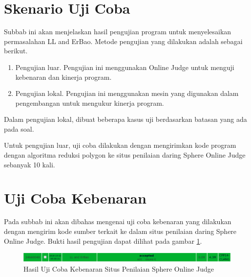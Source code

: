 \section{ Skenario Uji Coba}
\label{sec:skenario-uji-coba}
Subbab ini akan menjelaskan hasil pengujian program untuk menyelesaikan permasalahan LL and ErBao. Metode pengujian yang dilakukan adalah sebagai berikut.
\begin{enumerate}
	\item Pengujian luar. Pengujian ini menggunakan Online Judge untuk menguji kebenaran dan kinerja program.
	\item Pengujian lokal. Pengujian ini menggunakan mesin yang digunakan dalam pengembangan untuk mengukur kinerja program.
\end{enumerate}
Dalam pengujian lokal, dibuat beberapa kasus uji berdasarkan batasan yang ada pada soal.
\par Untuk pengujian luar, uji coba dilakukan dengan mengirimkan kode program dengan algoritma reduksi polygon ke situs penilaian daring Sphere Online Judge sebanyak 10 kali.

\section{ Uji Coba Kebenaran}
Pada subbab ini akan dibahas mengenai uji coba kebenaran yang dilakukan dengan mengirim kode sumber terkait ke dalam situs penilaian daring Sphere Online Judge. Bukti hasil pengujian dapat dilihat pada gambar \ref{fig:hasil-uji-coba-kebenaran-situs-penilaian-spoj}.
\begin{figure}[!h]
	\Centering
	\includegraphics [width=\columnwidth]{bab5/img/hasil-uji-coba-kebenaran-situs-penilaian-spoj}
	\caption {Hasil Uji Coba Kebenaran Situs Penilaian Sphere Online Judge}
	\label {fig:hasil-uji-coba-kebenaran-situs-penilaian-spoj}
\end{figure}

